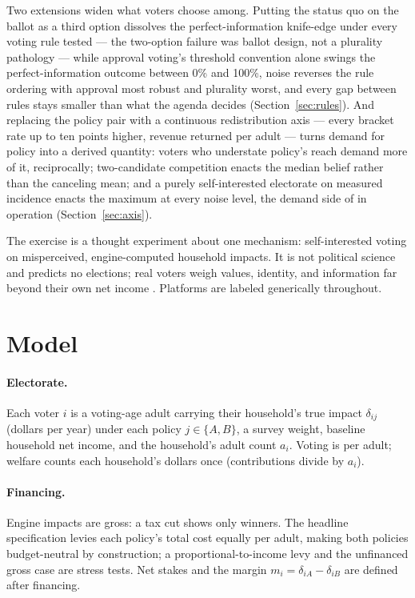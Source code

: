 \documentclass[11pt]{article}
\begin{document}
Two extensions widen what voters choose among. Putting the status quo
on the ballot as a third option dissolves the perfect-information
knife-edge under every voting rule tested --- the two-option failure
was ballot design, not a plurality pathology --- while approval
voting's threshold convention alone swings the perfect-information
outcome between 0\% and 100\%, noise reverses the rule ordering with
approval most robust and plurality worst, and every gap between rules
stays smaller than what the agenda decides (Section~\ref{sec:rules}).
And replacing the policy pair with a continuous redistribution axis ---
every bracket rate up to ten points higher, revenue returned per
adult --- turns demand for policy into a derived quantity: voters who
understate policy's reach demand more of it, reciprocally;
two-candidate competition enacts the median belief rather than the
canceling mean; and a purely self-interested electorate on measured
incidence enacts the maximum at every noise level, the demand side of
\citet{meltzer1981} in operation (Section~\ref{sec:axis}).

The exercise is a thought experiment about one mechanism: self-interested
voting on misperceived, engine-computed household impacts. It is not
political science and predicts no elections; real voters weigh values,
identity, and information far beyond their own net income
\citep{bartels2005, stantcheva2021}. Platforms are labeled generically
throughout.

\section{Model}\label{sec:model}

\paragraph{Electorate.} Each voter \(i\) is a voting-age adult carrying
their household's true impact \(\delta_{ij}\) (dollars per year) under each
policy \(j \in \{A, B\}\), a survey weight, baseline household net income,
and the household's adult count \(a_i\). Voting is per adult; welfare
counts each household's dollars once (contributions divide by \(a_i\)).

\paragraph{Financing.} Engine impacts are gross: a tax cut shows only
winners. The headline specification levies each policy's total cost equally
per adult, making both policies budget-neutral by construction;
a proportional-to-income levy and the unfinanced gross case are stress
tests. Net stakes and the margin \(m_i = \delta_{iA} - \delta_{iB}\) are
defined after financing.
\end{document}
